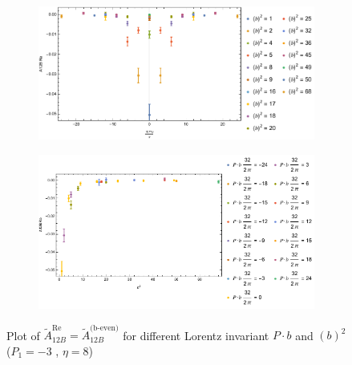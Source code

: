 \documentclass[]{article}
\numberwithin{equation}{section}
\newcommand{\tAmp}{\widetilde{A}}
\newcommand{\tAmp}{\ensuremath{\widetilde{A}^{(+)}}}
\begin{document}
\begin{figure}[h!]
     \centering
     \begin{subfigure}[b]{0.45\textwidth}
         \centering
         \includegraphics[width=\textwidth]{Amp_plots/bP_A12B_b_even_P1_-3_eta_8.pdf}
     \end{subfigure}
     \begin{subfigure}[b]{0.45\textwidth}
         \centering
         \includegraphics[width=\textwidth]{Amp_plots/bsq_A12B_b_even_P1_-3_eta_8.pdf}
     \end{subfigure}
        \caption{Plot of $\tAmp^{\text{Re}}_{12B}=\tAmp^{\text{(b-even)}}_{12B}$ for different Lorentz invariant $P\cdot b$ and $(b)^2$  ($P_{1} = -3$ , $\eta=8$)}
\end{figure}
\end{document}
